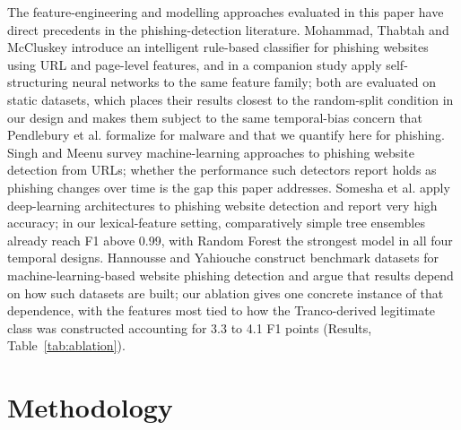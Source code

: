 \documentclass[10pt, a4paper, oneside]{article}
\begin{document}
The feature-engineering and modelling approaches evaluated in this paper have direct precedents in the phishing-detection literature. Mohammad, Thabtah and McCluskey \cite{mohammad2014phishing} introduce an intelligent rule-based classifier for phishing websites using URL and page-level features, and in a companion study \cite{mohammad2013neural} apply self-structuring neural networks to the same feature family; both are evaluated on static datasets, which places their results closest to the random-split condition in our design and makes them subject to the same temporal-bias concern that Pendlebury et al. \cite{pendlebury2019tesseract} formalize for malware and that we quantify here for phishing. Singh and Meenu \cite{singh2020phishing} survey machine-learning approaches to phishing website detection from URLs; whether the performance such detectors report holds as phishing changes over time is the gap this paper addresses. Somesha et al. \cite{somesha2020phishing} apply deep-learning architectures to phishing website detection and report very high accuracy; in our lexical-feature setting, comparatively simple tree ensembles already reach F1 above 0.99, with Random Forest the strongest model in all four temporal designs. Hannousse and Yahiouche \cite{hannousse2021benchmark} construct benchmark datasets for machine-learning-based website phishing detection and argue that results depend on how such datasets are built; our ablation gives one concrete instance of that dependence, with the features most tied to how the Tranco-derived legitimate class was constructed accounting for 3.3 to 4.1 F1 points (Results, Table~\ref{tab:ablation}).


\section{Methodology}
\end{document}
